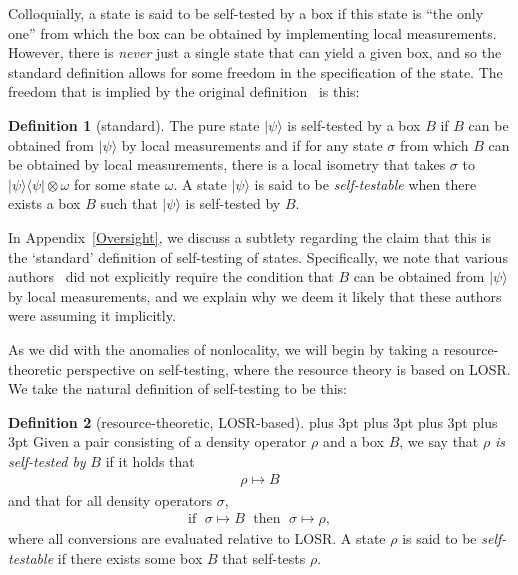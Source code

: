\documentclass[12pt]{article}
\theoremstyle{plain}
\theoremstyle{definition}
\newtheorem{defn}{Definition}
\begin{document}
Colloquially, a state is said to be self-tested by a box if this state is ``the only one'' from which the box can be obtained by implementing local measurements. However, there is {\em never} just a single state that can yield a given box, and so the standard definition allows for some freedom in the specification of the state.  The freedom that is implied by the original definition~\cite{mayers1998quantum,mayers2003self,Yang2013selftesting,Wang2016} is this:
\begin{defn}[standard]\label{defnselftesteOld}
The pure state $|\psi\rangle$ is self-tested by a  box $B$  if $B$ can be obtained from $|\psi\rangle$ by local measurements and if for any state $\sigma$ from which $B$ can be obtained by local measurements, there is a local isometry that takes $\sigma$ to $|\psi\rangle\langle \psi| \otimes \omega$ for some state $\omega$.
A state $|\psi\rangle$ is said to be {\em self-testable} when there exists a box $B$ such that $|\psi\rangle$ is self-tested by $B$.
 \end{defn}

In Appendix~\ref{Oversight}, we discuss a subtlety regarding the claim that this is the `standard' definition of self-testing of states. Specifically, we note that various authors~\cite{Coladangelo2017,vsupic2020self} did not explicitly require 
 the condition that $B$ can be obtained from $|\psi\rangle$ by local measurements, and we explain why we deem it likely that 
these authors were assuming it implicitly.

As we did with the anomalies of nonlocality, we will begin by taking a resource-theoretic perspective on self-testing, where the resource theory is based on LOSR.  We take the natural definition of self-testing to be this: 
\begin{defn}[resource-theoretic, LOSR-based]\label{defnselfteste}
{
\abovedisplayskip=1pt plus 3pt
\belowdisplayskip=1pt plus 3pt
\abovedisplayshortskip=1pt plus 3pt
\belowdisplayshortskip=1pt plus 3pt
Given a pair consisting of a density operator $\rho$ and a box $B$, we say that $\rho$  {\em is self-tested by} $B$ if it holds that
\begin{align}
\rho \mapsto B\nonumber
\end{align}
 and that for all density operators $\sigma$,
\begin{align} 
\textrm{if }\; \sigma \mapsto B\; \textrm{ then }\; \sigma \mapsto \rho,\nonumber
\end{align}
where all conversions are evaluated relative to LOSR. A state $\rho$ is said to be {\em self-testable} if there exists some box $B$ that self-tests $\rho$.
}\end{defn}
\end{document}
